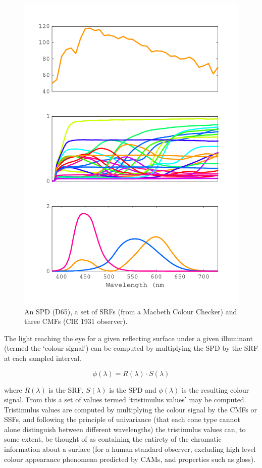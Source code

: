 \begin{figure}[htbp]
\includegraphics[max width=\textwidth]{figs/LitRev/SPDetc.pdf}
\caption{An \gls{SPD} (D65), a set of \glspl{SRF} (from a Macbeth Colour Checker) and three \glspl{CMF} (\gls{CIE} 1931 observer).}
\label{fig:specFun}
\end{figure}

The light reaching the eye for a given reflecting surface under a given illuminant (termed the `colour signal') can be computed by multiplying the \gls{SPD} by the \gls{SRF} at each sampled interval.

\begin{equation}
\phi(\lambda)=R(\lambda) \cdot S(\lambda)
\end{equation}

where $R(\lambda)$ is the \gls{SRF}, $S(\lambda)$ is the \gls{SPD} and $\phi(\lambda)$ is the resulting colour signal. From this a set of values termed `tristimulus values' may be computed. Tristimulus values are computed by multiplying the colour signal by the \glspl{CMF} or \glspl{SSF}, and following the principle of univariance (that each cone type cannot alone distinguish between different wavelengths) the tristimulus values can, to some extent, be thought of as containing the entirety of the chromatic information about a surface (for a human standard observer, excluding high level colour appearance phenomena predicted by \Glspl{CAM}, and properties such as gloss).

